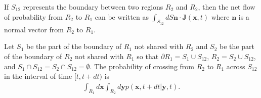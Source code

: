 \documentclass{article}
\newcommand{\mb}{\mathbf}
\begin{document}
\begin{claim} \label{probcurrent}
If $S_{12}$ represents the boundary between two regions $R_2$ and $R_2$, then the net flow of probability from $R_2$ to $R_1$ can be written as $\int_{S_{12}} dS {\mb n}\cdot {\mb J}({\mb x},t) $ where ${\mb n}$ is a normal vector from $R_2$ to $R_1$.  
\end{claim}

\begin{pf}
Let $S_1$ be the part of the boundary of $R_1$ not shared with $R_2$ and $S_2$ be the part of the boundary of $R_2$ not shared with $R_1$ so that  $\partial R_1=S_1\cup S_{12}$, $R_2=S_2\cup S_{12}$, and $S_1\cap S_{12}=S_2\cap S_{12}=\emptyset$. The probability of crossing from $R_2$ to $R_1$ across $S_{12}$ in the interval of time $[t,t+dt)$ is 
\begin{align*}
\int_{R_1}d{\mb x}\int_{R_2}d{\mb y} p({\mb x},t+dt|{\mb y},t).
\end{align*}




\end{pf}
\end{document}
